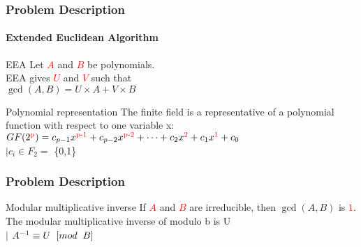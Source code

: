 \documentclass[12pt]{beamer}
\def\SP#1{\textsuperscript{\textcolor{red}{#1}}}
\begin{document}
\begin{frame}
	\frametitle{Problem Description}
	\framesubtitle{Extended Euclidean Algorithm}
	\begin{block}{EEA}
		Let \textcolor{red}{$A$} and \textcolor{red}{$B$} be polynomials.\\
		EEA gives \textcolor{red}{$U$} and \textcolor{red}{$V$} such that\\
		$\gcd{(A, B)} = U \times A + V \times B$\\
	\end{block}
		\begin{block}{Polynomial representation}
	  	The finite field is a representative of a polynomial function with respect to one variable x: \\
	  	$GF(2\SP{p}) = c_{p-1}x\SP{p-1} + c_{p-2}x\SP{p-2} + \dots + c_{2}x\SP{2} + c_{1}x\SP{1} + c_{0}$ \\
	  	$\mid c_{i} \in F_{2} =$ \{0,1\}
	\end{block}
	
\end{frame}
\begin{frame}
\frametitle{Problem Description}
	\begin{block}{Modular multiplicative inverse}
	\justify
		If \textcolor{red}{$A$} and \textcolor{red}{$B$} are irreducible, then $\gcd(A, B)$ is \textcolor{red}{$1$}.\\
		The modular multiplicative inverse of  modulo b is U \\ $\mid$ \hspace{2mm} $A^{-1} \equiv U\hspace{2mm} [mod\hspace{2mm}B]$
	\end{block}
\end{frame}
\end{document}
